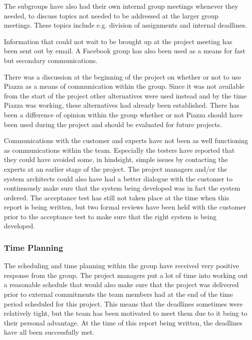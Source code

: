 \documentclass[a4paper]{article}
\begin{document}
The subgroups have also had their own internal group meetings whenever they needed, to discuss topics not needed to be addressed at the larger group meetings. These topics include e.g. division of assignments and internal deadlines.

Information that could not wait to be brought up at the project meeting has been sent out by email. A Facebook group has also been used as a means for fast but secondary communications.

There was a discussion at the beginning of the project on whether or not to use Piazza as a means of communication within the group. Since it was not available from the start of the project other alternatives were used instead and by the time Piazza was working, these alternatives had already been established. There has been a difference of opinion within the group whether or not Piazza should have been used during the project and should be evaluated for future projects.

Communications with the customer and experts have not been as well functioning as communications within the team. Especially the testers have reported that they could have avoided some, in hindsight, simple issues by contacting the experts at an earlier stage of the project. The project managers and/or the system architects could also have had a better dialogue with the customer to continuously make sure that the system being developed was in fact the system ordered. The acceptance test has still not taken place at the time when this report is being written, but two formal reviews have been held with the customer prior to the acceptance test to make sure that the right system is being developed.



\subsubsection{Time Planning}
The scheduling and time planning within the group have received very positive response from the group. The project managers put a lot of time into working out a reasonable schedule that would also make sure that the project was delivered prior to external commitments the team members had at the end of the time period scheduled for this project. This means that the deadlines sometimes were relatively tight, but the team has been motivated to meet them due to it being to their personal advantage. At the time of this report being written, the deadlines have all been successfully met. 
\end{document}
